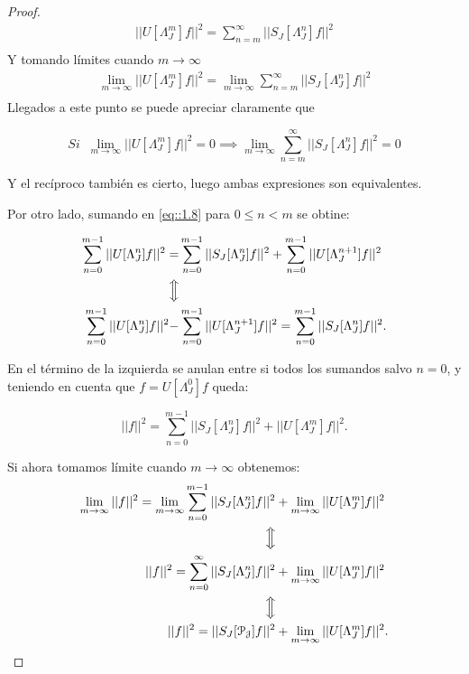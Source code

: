 \begin{proof}
  \begin{align*}
    ||U[\Lambda_J^m]f||^2 =\sum_{n=m}^\infty ||S_J[\Lambda_J^n]f||^2  \\
  \end{align*}
  \noindent Y tomando límites cuando $m\rightarrow \infty$
  \begin{align*}
    \lim_{m\rightarrow \infty}||U[\Lambda_J^m]f||^2 =\lim_{m\rightarrow \infty}\sum_{n=m}^\infty ||S_J[\Lambda_J^n]f||^2  \\
  \end{align*}
  \noindent Llegados a este punto se puede apreciar claramente que
  
  $$Si \; \; \lim_{m\rightarrow \infty} ||U[\Lambda_J^m]f||^2=0 \implies \lim_{m\rightarrow\infty} \sum_{n=m}^{\infty} ||S_J[\Lambda_J^n]f||^2=0$$

  \noindent Y el recíproco también es cierto, luego ambas expresiones son equivalentes.

  \medskip

  \noindent Por otro lado, sumando en \eqref{eq::1.8} para $0\leq n < m$ se obtine:

  \begin{align*}
    \sum_{n=0}^{m-1} ||U[\Lambda_J^n]f||^2=&\sum_{n=0}^{m-1} ||S_J[\Lambda_J^n]f||^2 +\sum_{n=0}^{m-1}||U[\Lambda_J^{n+1}]f||^2 \\
    \Big\Updownarrow \\
    \sum_{n=0}^{m-1} ||U[\Lambda_J^n]f||^2 -& \sum_{n=0}^{m-1}||U[\Lambda_J^{n+1}]f||^2 = \sum_{n=0}^{m-1} ||S_J[\Lambda_J^n]f||^2.  \\
  \end{align*}
  
  \noindent En el término de la izquierda se anulan entre si todos los sumandos salvo $n=0$, y teniendo en cuenta que $f=U[\Lambda_J^0]f$ queda:
  
  \begin{equation}
    ||f||^2=\sum_{n=0}^{m-1} ||S_J[\Lambda_J^n]f||^2 + ||U[\Lambda_J^m]f||^2.
  \end{equation}

  \noindent Si ahora tomamos límite cuando $m\rightarrow \infty$ obtenemos: 
  \begin{align*}
    \lim_{m\rightarrow \infty}||f||^2 =\lim_{m\rightarrow \infty}\sum_{n=0}^{m-1} ||S_J[\Lambda_J^n]f||^2 &+ \lim_{m\rightarrow \infty} ||U[\Lambda_J^m]f||^2  \\
    \Big\Updownarrow \\
    ||f||^2 =\sum_{n=0}^{\infty} ||S_J[\Lambda_J^n]f||^2 &+ \lim_{m\rightarrow \infty} ||U[\Lambda_J^m]f||^2  \\
    \Big\Updownarrow \\
    ||f||^2 =||S_J[\mathcal{P_J}]f||^2 &+ \lim_{m\rightarrow \infty} ||U[\Lambda_J^m]f||^2.  \\
  \end{align*}


\end{proof}
